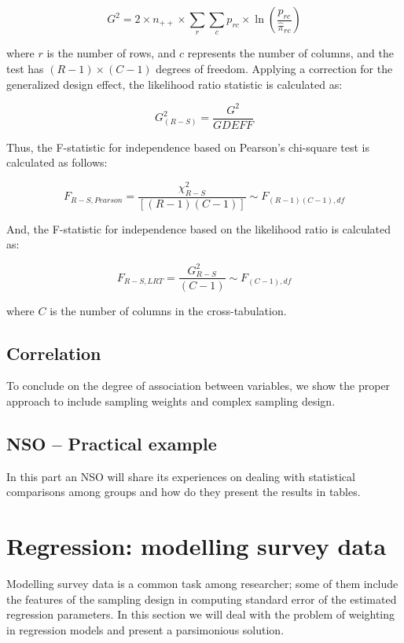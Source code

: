 \documentclass[
  12pt,
]{book}
\begin{document}
\[
G^{2} = 2 \times n_{++} \times \sum_{r} \sum_{c} p_{rc} \times \ln \left( \frac{p_{rc}}{\hat{\pi}_{rc}} \right)
\]

where \(r\) is the number of rows, and \(c\) represents the number of columns, and the test has \((R-1) \times (C-1)\) degrees of freedom. Applying a correction for the generalized design effect, the likelihood ratio statistic is calculated as:

\[
G^2_{(R-S)} = \frac{G^2}{GDEFF}
\]

Thus, the F-statistic for independence based on Pearson's chi-square test is calculated as follows:

\[
F_{R-S,Pearson} = \frac{\chi^{2}_{R-S}}{\left[(R-1)(C-1)\right]} \sim F_{\left(R-1\right)\left(C-1\right),df}
\]

And, the F-statistic for independence based on the likelihood ratio is calculated as:

\[
F_{R-S,LRT} = \frac{G^{2}_{R-S}}{(C-1)} \sim F_{\left(C-1\right),df}
\]

where \(C\) is the number of columns in the cross-tabulation.

\hypertarget{correlation}{%
\section{Correlation}\label{correlation}}

To conclude on the degree of association between variables, we show the proper approach to include sampling weights and complex sampling design.

\hypertarget{nso-practical-example-1}{%
\section{NSO -- Practical example}\label{nso-practical-example-1}}

In this part an NSO will share its experiences on dealing with statistical comparisons among groups and how do they present the results in tables.

\hypertarget{regression-modelling-survey-data}{%
\chapter{Regression: modelling survey data}\label{regression-modelling-survey-data}}

Modelling survey data is a common task among researcher; some of them include the features of the sampling design in computing standard error of the estimated regression parameters. In this section we will deal with the problem of weighting in regression models and present a parsimonious solution.
\end{document}
